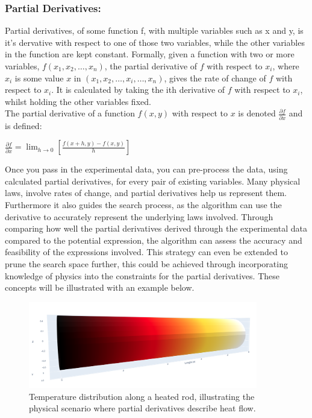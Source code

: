 \documentclass{article}
\begin{document}
\subsubsection{Partial Derivatives: }


Partial derivatives, of some function f, with multiple variables such as x and y, is it's dervative with respect to one of those two variables, while the other variables in the function are kept constant. Formally, given a function with two or more variables, $f(x_1, x_2, \ldots, x_n) $, the partial derivative of $f$ with respect to $x_i$, where $x_i$ is some value $x$ in $(x_1, x_2, \ldots, x_i, \ldots, x_n)$, gives the rate of change of $f$ with respect to $x_i$. It is calculated by taking the ith derivative of $f$ with respect to $x_i$, whilst holding the other variables fixed. \cite{Stewart2012} \cite{Smith2012} \\

The partial derivative of a function $f(x,y)$ with respect to $x$ is denoted $\frac{\partial f}{\partial x}$ \cite{Kelly2021} and is defined: \\ 

\begin{center}

  $\frac{\partial f}{\partial x} = \lim_{h \to 0} \left[ \frac{f(x+h, y) - f(x,y)}{h} \right]$
\end{center}


Once you pass in the experimental data, you can pre-process the data, using calculated partial derivatives, for every pair of existing variables. Many physical laws, involve rates of change, and partial
derivatives help us represent them. Furthermore it also guides the search process, as the algorithm can
use the derivative to accurately represent the underlying laws involved. Through comparing how well
the partial derivatives derived through the experimental data compared to the potential expression,
the algorithm can assess the accuracy and feasibility of the expressions involved. This strategy can
even be extended to prune the search space further, this could be achieved through incorporating
knowledge of physics into the constraints for the partial derivatives. These concepts will be illustrated
with an example below.\\

\begin{figure}[h] 
    \centering
    \includegraphics[width=10cm]{heated_rod} 
    \caption{Temperature distribution along a heated rod, illustrating the physical scenario where partial derivatives describe heat flow.}
    \label{fig:Rod} 
\end{figure}
\end{document}
